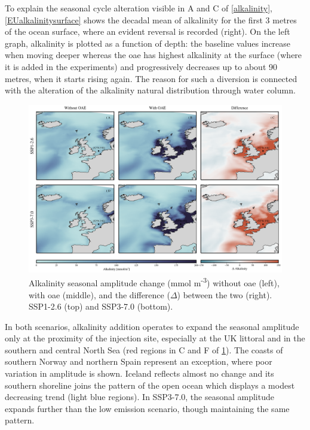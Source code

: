 To explain the seasonal cycle alteration visible in A and C of \cref{alkalinity}, \cref{EUalkalinitysurface} shows the decadal mean of alkalinity for the first 3 metres of the ocean surface, where an evident reversal is recorded (right). On the left graph, alkalinity is plotted as a function of depth: the baseline values increase when moving deeper whereas the \ac{oae} has highest alkalinity at the surface (where it is added in the experiments) and progressively decreases up to about 90 metres, when it starts rising again. The reason for such a diversion is connected with the alteration of the alkalinity natural distribution through water column. 

\begin{figure}[H]
\caption[Alkalinity seasonal amplitude change]{Alkalinity seasonal amplitude change (mmol m\textsuperscript{-3}) without \ac{oae} (left), with \ac{oae} (middle), and the difference ($\Delta$) between the two (right). SSP1-2.6 (top) and SSP3-7.0 (bottom).}
\label{alkalinityamplitude}
\centering
\includegraphics[width=15cm]{fig/3_Results/Alkalinity/alkalinity_ampl.png}

\end{figure}

In both scenarios, alkalinity addition operates to expand the seasonal amplitude only at the proximity of the injection site, especially at the UK littoral and in the southern and central North Sea (red regions in C and F of \cref{alkalinityamplitude}). The coasts of southern Norway and northern Spain represent an exception, where poor variation in amplitude is shown. Iceland reflects almost no change and its southern shoreline joins the pattern of the open ocean which displays a modest decreasing trend (light blue regions). In SSP3-7.0, the seasonal amplitude expands further than the low emission scenario, though maintaining the same pattern.

